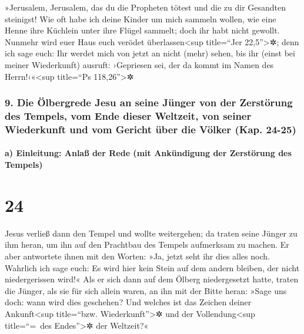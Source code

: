  »Jerusalem, Jerusalem, das du die Propheten tötest und
die zu dir Gesandten steinigst! Wie oft habe ich deine Kinder um mich
sammeln wollen, wie eine Henne ihre Küchlein unter ihre Flügel sammelt;
doch ihr habt nicht gewollt.  Nunmehr wird euer Haus euch
verödet überlassen\textless sup title=``Jer 22,5''\textgreater✲;
 denn ich sage euch: Ihr werdet mich von jetzt an nicht
(mehr) sehen, bis ihr (einst bei meiner Wiederkunft) ausruft: ›Gepriesen
sei, der da kommt im Namen des Herrn!‹«\textless sup title=``Ps
118,26''\textgreater✲

\hypertarget{die-uxf6lbergrede-jesu-an-seine-juxfcnger-von-der-zerstuxf6rung-des-tempels-vom-ende-dieser-weltzeit-von-seiner-wiederkunft-und-vom-gericht-uxfcber-die-vuxf6lker-kap.-24-25}{%
\subsubsection{9. Die Ölbergrede Jesu an seine Jünger von der Zerstörung
des Tempels, vom Ende dieser Weltzeit, von seiner Wiederkunft und vom
Gericht über die Völker (Kap.
24-25)}\label{die-uxf6lbergrede-jesu-an-seine-juxfcnger-von-der-zerstuxf6rung-des-tempels-vom-ende-dieser-weltzeit-von-seiner-wiederkunft-und-vom-gericht-uxfcber-die-vuxf6lker-kap.-24-25}}

\hypertarget{a-einleitung-anlauxdf-der-rede-mit-ankuxfcndigung-der-zerstuxf6rung-des-tempels}{%
\paragraph{a) Einleitung: Anlaß der Rede (mit Ankündigung der Zerstörung
des
Tempels)}\label{a-einleitung-anlauxdf-der-rede-mit-ankuxfcndigung-der-zerstuxf6rung-des-tempels}}

\hypertarget{section-23}{%
\section{24}\label{section-23}}

 Jesus verließ dann den Tempel und wollte weitergehen; da
traten seine Jünger zu ihm heran, um ihn auf den Prachtbau des Tempels
aufmerksam zu machen.  Er aber antwortete ihnen mit den
Worten: »Ja, jetzt seht ihr dies alles noch. Wahrlich ich sage euch: Es
wird hier kein Stein auf dem andern bleiben, der nicht niedergerissen
wird!«  Als er sich dann auf dem Ölberg niedergesetzt
hatte, traten die Jünger, als sie für sich allein waren, an ihn mit der
Bitte heran: »Sage uns doch: wann wird dies geschehen? Und welches ist
das Zeichen deiner Ankunft\textless sup title=``bzw.
Wiederkunft''\textgreater✲ und der Vollendung\textless sup title=``=~des
Endes''\textgreater✲ der Weltzeit?«

